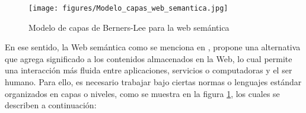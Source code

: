\begin{figure}[!ht]
    \centering
    \texttt{[image: figures/Modelo\_capas\_web\_semantica.jpg]} %
    \caption{Modelo de capas de Berners-Lee para la web semántica\cite{WebSemantica_SciELO}} %
    \label{Modelo_Web_Semantica}
\end{figure}

En ese sentido, la Web semántica como se menciona en \cite{IntroBD_RDF}, propone una alternativa que agrega significado a los contenidos almacenados en la Web, lo cual permite una interacción más fluida entre aplicaciones, servicios o computadoras y el ser humano. Para ello, es necesario trabajar bajo ciertas normas o lenguajes estándar organizados en capas o niveles, como se muestra en la figura \ref{Modelo_Web_Semantica}, los cuales se describen a continuación: \cite{IntroBD_RDF}

